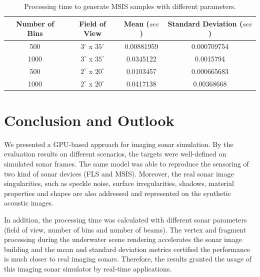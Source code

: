 \documentclass[final,5p,times]{elsarticle}
\begin{document}
\begin{table}
    \caption{Processing time to generate MSIS samples with different parameters.}
    \label{table:msis}
    \begin{center}
        \begin{tabular}{| c | c | c | c |}
            \hline
            Number of Bins & Field of View & Mean ($sec$) & Standard Deviation ($sec$) \\
            \hline
            500       & $3^{\circ}$ x $35^{\circ}$        & 0.00881959	& 0.000709754  \\ \hline
            1000      & $3^{\circ}$ x $35^{\circ}$        & 0.0345122	& 0.0015794    \\ \hline
            500       & $2^{\circ}$ x $20^{\circ}$        & 0.0103457	& 0.000665683  \\ \hline
            1000      & $2^{\circ}$ x $20^{\circ}$        & 0.0417138	& 0.00368668   \\ \hline
        \end{tabular}
    \end{center}
\end{table}


\section{Conclusion and Outlook}
\label{conclusion}

We presented a GPU-based approach for imaging sonar simulation. By the evaluation results on different scenarios, the targets were well-defined on simulated sonar frames. The same model was able to reproduce the sensoring of two kind of sonar devices (FLS and MSIS). Moreover, the real sonar image singularities, such as speckle noise, surface irregularities, shadows, material properties and shapes are also addressed and represented on the synthetic acoustic images.

In addition, the processing time was calculated with different sonar parameters (field of view, number of bins and number of beams). The vertex and fragment processing during the underwater scene rendering accelerates the sonar image building and the mean and standard deviation metrics certified the performance is much closer to real imaging sonars. Therefore, the results granted the usage of this imaging sonar simulator by real-time applications.
\end{document}
